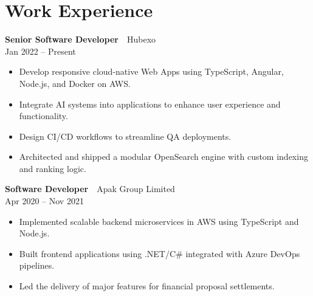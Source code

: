 \documentclass[11pt,a4paper]{moderncv}
\begin{document}
\section{Work Experience}
\vspace{-1em}

\begin{minipage}[c]{0.08\textwidth}
  \raggedleft
\end{minipage}%
\hspace{0.5em}%
\begin{minipage}[t]{0.95\textwidth}
  \textbf{Senior Software Developer} \,\textbullet\, {\color{mydarkblue}Hubexo}\\
  {\footnotesize Jan 2022 -- Present}
  \begin{itemize}
    \item Develop responsive cloud-native Web Apps using TypeScript, Angular, Node.js, and Docker on AWS.
    \item Integrate AI systems into applications to enhance user experience and functionality.
    \item Design CI/CD workflows to streamline QA deployments.
    \item Architected and shipped a modular OpenSearch engine with custom indexing and ranking logic.
  \end{itemize}
\end{minipage}
\vspace{0.5em}

\begin{minipage}[c]{0.08\textwidth}
  \raggedleft
\end{minipage}%
\hspace{0.5em}%
\begin{minipage}[t]{0.9\textwidth}
  \textbf{Software Developer} \,\textbullet\, {\color{mydarkblue}Apak Group Limited}\\
  {\footnotesize Apr 2020 -- Nov 2021}
  \begin{itemize}
    \item Implemented scalable backend microservices in AWS using TypeScript and Node.js.
    \item Built frontend applications using .NET/C\# integrated with Azure DevOps pipelines.
    \item Led the delivery of major features for financial proposal settlements.
  \end{itemize}
\end{minipage}
\vspace{0.5em}
\end{document}
